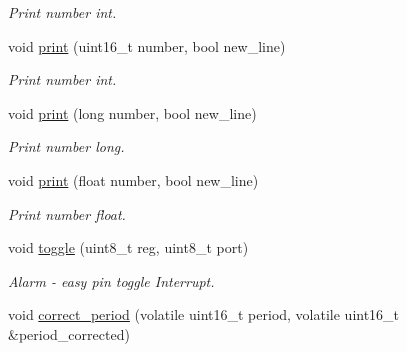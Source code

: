 \begin{DoxyCompactItemize}
\begin{DoxyCompactList}\small\item\em Print number int. \end{DoxyCompactList}\item 
void \hyperlink{namespaceSPMB_1_1util_a6bbbaa47ffb222ffefbaa6e699499680}{print} (uint16\+\_\+t number, bool new\+\_\+line)\hypertarget{namespaceSPMB_1_1util_a6bbbaa47ffb222ffefbaa6e699499680}{}\label{namespaceSPMB_1_1util_a6bbbaa47ffb222ffefbaa6e699499680}

\begin{DoxyCompactList}\small\item\em Print number int. \end{DoxyCompactList}\item 
void \hyperlink{namespaceSPMB_1_1util_a1cdc21855101c0831fc67136d4ed213e}{print} (long number, bool new\+\_\+line)\hypertarget{namespaceSPMB_1_1util_a1cdc21855101c0831fc67136d4ed213e}{}\label{namespaceSPMB_1_1util_a1cdc21855101c0831fc67136d4ed213e}

\begin{DoxyCompactList}\small\item\em Print number long. \end{DoxyCompactList}\item 
void \hyperlink{namespaceSPMB_1_1util_a283514fcdb842b663e5aca645df446b8}{print} (float number, bool new\+\_\+line)\hypertarget{namespaceSPMB_1_1util_a283514fcdb842b663e5aca645df446b8}{}\label{namespaceSPMB_1_1util_a283514fcdb842b663e5aca645df446b8}

\begin{DoxyCompactList}\small\item\em Print number float. \end{DoxyCompactList}\item 
void \hyperlink{namespaceSPMB_1_1util_a62c1cfce77b01d236e24c91055b187de}{toggle} (uint8\+\_\+t reg, uint8\+\_\+t port)\hypertarget{namespaceSPMB_1_1util_a62c1cfce77b01d236e24c91055b187de}{}\label{namespaceSPMB_1_1util_a62c1cfce77b01d236e24c91055b187de}

\begin{DoxyCompactList}\small\item\em Alarm -\/ easy pin toggle Interrupt. \end{DoxyCompactList}\item 
void \hyperlink{namespaceSPMB_1_1util_a25378d074df47bc965af23165934202f}{correct\+\_\+period} (volatile uint16\+\_\+t period, volatile uint16\+\_\+t \&period\+\_\+corrected)\hypertarget{namespaceSPMB_1_1util_a25378d074df47bc965af23165934202f}{}\label{namespaceSPMB_1_1util_a25378d074df47bc965af23165934202f}


\end{DoxyCompactItemize}
